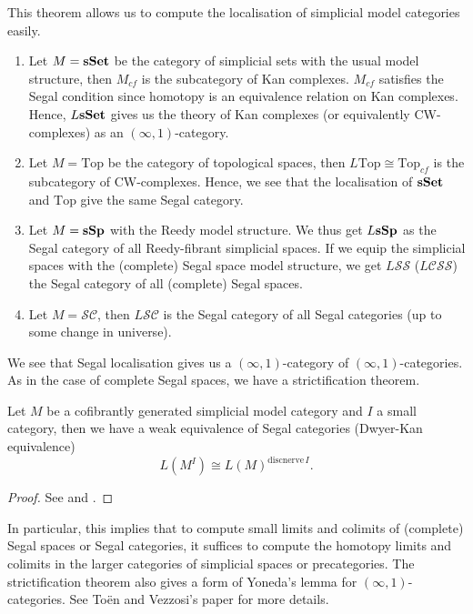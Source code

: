 \begin{refsection}
This theorem allows us to compute the localisation of simplicial model categories easily.
\begin{eg}
\begin{enumerate}
\item Let $M=\mathbf{sSet}$ be the category of simplicial sets with the usual model structure, then $M_{cf}$ is the subcategory of Kan complexes. $M_{cf}$ satisfies the Segal condition since homotopy is an equivalence relation on Kan complexes. Hence, $L\mathbf{sSet}$ gives us the theory of Kan complexes (or equivalently CW-complexes) as an $(\infty,1)$-category.
\item Let $M=\mathrm{Top}$ be the category of topological spaces, then $L\mathrm{Top}\cong\mathrm{Top}_{cf}$ is the subcategory of CW-complexes. Hence, we see that the localisation of $\mathbf{sSet}$ and $\mathrm{Top}$ give the same Segal category.
\item Let $M=\mathbf{sSp}$ with the Reedy model structure. We thus get $L\mathbf{sSp}$ as the Segal category of all Reedy-fibrant simplicial spaces. If we equip the simplicial spaces with the (complete) Segal space model structure, we get $L\mathcal{SS}$ ($L\mathcal{CSS}$) the Segal category of all (complete) Segal spaces.
\item Let $M=\mathcal{SC}$, then $L\mathcal{SC}$ is the Segal category of all Segal categories (up to some change in universe).
\end{enumerate}
\end{eg}
We see that Segal localisation gives us a $(\infty,1)$-category of $(\infty,1)$-categories. As in the case of complete Segal spaces, we have a strictification theorem.

\begin{thm}
Let $M$ be a cofibrantly generated simplicial model category and $I$ a small category, then we have a weak equivalence of Segal categories (Dwyer-Kan equivalence)
$$L(M^I)\cong L(M)^{\mathrm{discnerve}\,I}.$$
\end{thm}
\begin{proof}
See \cite{hs} and \cite{tv}.
\end{proof}

In particular, this implies that to compute small limits and colimits of (complete) Segal spaces or Segal categories, it suffices to compute the homotopy limits and colimits in the larger categories of simplicial spaces or precategories. The strictification theorem also gives a form of Yoneda's lemma for $(\infty,1)$-categories. See To\"en and Vezzosi's paper \cite{tv} for more details.



\end{refsection}
